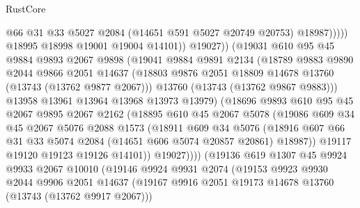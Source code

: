 \begin{lexlean}{RustCore}
\begin{coremodule}
                              @66
                              @31
                              @33
                              @5027
                              @2084
                              (@14651 @591 @5027 @20749 @20753)
                              @18987)))))
                    @18995
                    @18998
                    @19001
                    @19004
                    @14101))
                @19027))
            (@19031
              @610
              @95
              @45
              @9884
              @9893
              @2067
              @9898
              (@19041
                @9884
                @9891
                @2134
                (@18789
                  @9883
                  @9890
                  @2044
                  @9866
                  @2051
                  @14637
                  (@18803 @9876 @2051 @18809 @14678 @13760 (@13743 (@13762 @9877 @2067)))
                  @13760
                  (@13743 (@13762 @9867 @9883)))
                @13958
                @13961
                @13964
                @13968
                @13973
                @13979)
              (@18696
                @9893
                @610
                @95
                @45
                @2067
                @9895
                @2067
                @2162
                (@18895
                  @610
                  @45
                  @2067
                  @5078
                  (@19086
                    @609
                    @34
                    @45
                    @2067
                    @5076
                    @2088
                    @1573
                    (@18911
                      @609
                      @34
                      @5076
                      (@18916
                        @607
                        @66
                        @31
                        @33
                        @5074
                        @2084
                        (@14651 @606 @5074 @20857 @20861)
                        @18987))
                    @19117
                    @19120
                    @19123
                    @19126
                    @14101))
                @19027))))
        (@19136
          @619
          @1307
          @45
          @9924
          @9933
          @2067
          @10010
          (@19146
            @9924
            @9931
            @2074
            (@19153
              @9923
              @9930
              @2044
              @9906
              @2051
              @14637
              (@19167 @9916 @2051 @19173 @14678 @13760 (@13743 (@13762 @9917 @2067)))

\end{coremodule}
\end{lexlean}
